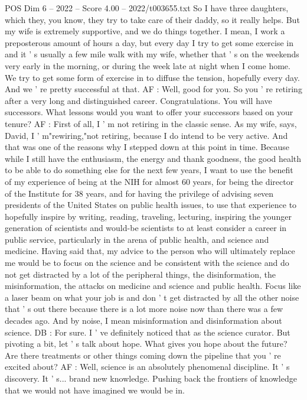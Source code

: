 \begin{textsample}{POS Dim 6 – 2022 – Score 4.00 – 2022/t003655.txt}
So I have three daughters, which they, you know, they try to take care of their daddy, so it really helps.
But my wife is extremely supportive, and we do things together.
I mean, I work a preposterous amount of hours a day, but every day I try to get some exercise in and it ' s usually a few mile walk with my wife, whether that ' s on the weekends very early in the morning, or during the week late at night when I come home.
We try to get some form of exercise in to diffuse the tension, hopefully every day.
And we ' re pretty successful at that.
AF : Well, good for you.
So you ' re retiring after a very long and distinguished career.
Congratulations.
You will have successors.
What lessons would you want to offer your successors based on your tenure?
AF : First of all, I ' m not retiring in the classic sense.
As my wife, says, David, I ' m"rewiring,"not retiring, because I do intend to be very active.
And that was one of the reasons why I stepped down at this point in time.
Because while I still have the enthusiasm, the energy and thank goodness, the good health to be able to do something else for the next few years, I want to use the benefit of my experience of being at the NIH for almost 60 years, for being the director of the Institute for 38 years, and for having the privilege of advising seven presidents of the United States on public health issues, to use that experience to hopefully inspire by writing, reading, traveling, lecturing, inspiring the younger generation of scientists and would-be scientists to at least consider a career in public service, particularly in the arena of public health, and science and medicine.
Having said that, my advice to the person who will ultimately replace me would be to focus on the science and be consistent with the science and do not get distracted by a lot of the peripheral things, the disinformation, the misinformation, the attacks on medicine and science and public health.
Focus like a laser beam on what your job is and don ' t get distracted by all the other noise that ' s out there because there is a lot more noise now than there was a few decades ago.
And by noise, I mean misinformation and disinformation about science.
DB : For sure.
I ' ve definitely noticed that as the science curator.
But pivoting a bit, let ' s talk about hope.
What gives you hope about the future?
Are there treatments or other things coming down the pipeline that you ' re excited about?
AF : Well, science is an absolutely phenomenal discipline.
It ' s discovery.
It ' s... brand new knowledge.
Pushing back the frontiers of knowledge that we would not have imagined we would be in.

\end{textsample}
